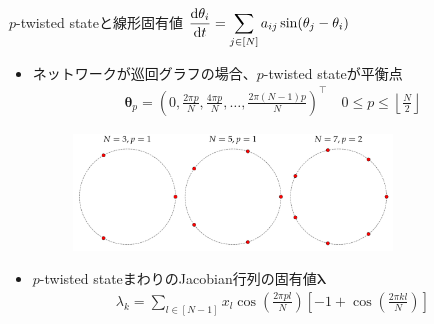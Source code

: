 \begin{frame}{$p$-twisted stateと線形固有値}
    \centering
  $\displaystyle\frac{\mathrm{d}\theta_{i}}{\mathrm{d} t}=\sum_{j\in[N]}a_{ij}\sin(\theta_{j}-\theta_{i})$
\begin{itemize}
\item ネットワークが巡回グラフの場合、$p$-twisted stateが平衡点
\begin{align*}
\bm{\theta}_{p}=\left(0,\frac{2\pi p}{N}, \frac{4\pi p}{N},\dots, \frac{2\pi (N-1)p}{N}\right)^{\top}\quad 0\leq p\leq\left\lfloor\frac{N}{2}\right\rfloor
\end{align*}
\begin{figure}
    \centering
    \includegraphics[width=0.8\textwidth]{figs/twisted_state.pdf}
\end{figure}
\item $p$-twisted stateまわりのJacobian行列の固有値$\bm{\lambda}$
\begin{align*}
    \lambda_{k}=\sum_{l\in[N-1]}x_{l}\cos\left(\frac{2\pi pl}{N}\right)\left[-1+\cos\left(\frac{2\pi kl}{N}\right)\right]
\end{align*}
\end{itemize}
\end{frame}

